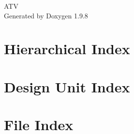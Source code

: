 \documentclass[twoside]{book}
\newcommand{\+}{\discretionary{\mbox{\scriptsize$\hookleftarrow$}}{}{}}
\newcommand{\clearemptydoublepage}{%
    \newpage{\pagestyle{empty}\cleardoublepage}%
  }
\begin{document}
  \raggedbottom
    \hypersetup{pageanchor=false,
                bookmarksnumbered=true,
                pdfencoding=unicode
               }
  \begin{titlepage}
  \vspace*{7cm}
  \begin{center}%
  {\Large ATV}\\
  \vspace*{1cm}
  {\large Generated by Doxygen 1.9.8}\\
  \end{center}
  \end{titlepage}
  \clearemptydoublepage
  \tableofcontents
  \clearemptydoublepage
  \hypersetup{pageanchor=true}
\chapter{Hierarchical Index}

\chapter{Design Unit Index}

\chapter{File Index}

\end{document}
